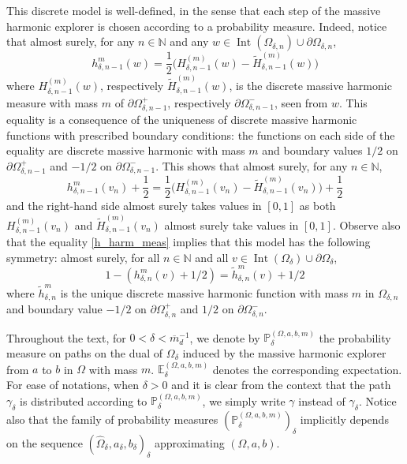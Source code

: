 \documentclass{article}
\newcommand{\PP}{{\mathbb{P}}}
\newcommand{\EE}{{\mathbb{E}}}
\theoremstyle{definition}
\theoremstyle{remark}
\theoremstyle{remark}
\begin{document}
This discrete model is well-defined, in the sense that each step of the massive harmonic explorer is chosen according to a probability measure. Indeed, notice that almost surely, for any $n \in \mathbb{N}$ and any $w \in \operatorname{Int}(\Omega_{\delta,n}) \cup \partial \Omega_{\delta,n}$,
\begin{equation} \label{h_harm_meas}
    h_{\delta,n-1}^m(w) = \frac{1}{2} \bigg( H_{\delta,n-1}^{(m)}(w) - \tilde H_{\delta,n-1}^{(m)}(w)\bigg)
\end{equation}
where $H_{\delta,n-1}^{(m)}(w)$, respectively $\tilde H_{\delta,n-1}^{(m)}(w)$, is the discrete massive harmonic measure with mass $m$ of $\partial \Omega_{\delta,n-1}^{+}$, respectively $\partial \Omega_{\delta,n-1}^{-}$, seen from $w$. This equality is a consequence of the uniqueness of discrete massive harmonic functions with prescribed boundary conditions: the functions on each side of the equality are discrete massive harmonic with mass $m$ and boundary values $1/2$ on $\partial \Omega_{\delta,n-1}^{+}$ and $-1/2$ on $\partial \Omega_{\delta,n-1}^{-}$. This shows that almost surely, for any $n \in \mathbb{N}$,
\begin{equation*}
    h_{\delta,n-1}^m(v_n) + \frac{1}{2} = \frac{1}{2} \bigg( H_{\delta,n-1}^{(m)}(v_n) - \tilde H_{\delta,n-1}^{(m)}(v_n)\bigg) + \frac{1}{2}
\end{equation*}
and the right-hand side almost surely takes values in $[0,1]$ as both $H_{\delta,n-1}^{(m)}(v_n)$ and $\tilde H_{\delta,n-1}^{(m)}(v_n)$ almost surely take values in $[0,1]$. Observe also that the equality \eqref{h_harm_meas} implies that this model has the following symmetry: almost surely, for all $n \in \mathbb{N}$ and all $v \in \operatorname{Int}(\Omega_{\delta}) \cup \partial \Omega_{\delta}$,
\begin{equation*}
    1- (h_{\delta,n}^m(v)+1/2) = \tilde h_{\delta,n}^m(v)+1/2
\end{equation*}
where $\tilde h_{\delta, n}^m$ is the unique discrete massive harmonic function with mass $m$ in $\Omega_{\delta, n}$ and boundary value $-1/2$ on $\partial \Omega_{\delta,n}^{+}$ and $1/2$ on $\partial \Omega_{\delta,n}^{-}$. 

Throughout the text, for $0 < \delta < \overline{m}_{d}^{-1}$, we denote by $\PP_{\delta}^{(\Omega,a,b,m)}$ the probability measure on paths on the dual of $\Omega_{\delta}$ induced by the massive harmonic explorer from $a$ to $b$ in $\Omega$ with mass $m$. $\EE_{\delta}^{(\Omega,a,b,m)}$ denotes the corresponding expectation. For ease of notations, when $\delta > 0$ and it is clear from the context that the path $\gamma_{\delta}$ is distributed according to $\PP_{\delta}^{(\Omega,a,b,m)}$, we simply write $\gamma$ instead of $\gamma_{\delta}$. Notice also that the family of probability measures $(\PP_{\delta}^{(\Omega,a,b,m)})_{\delta}$ implicitly depends on the sequence $(\hat \Omega_{\delta},a_{\delta},b_{\delta})_{\delta}$ approximating $(\Omega,a,b)$. 
\end{document}
